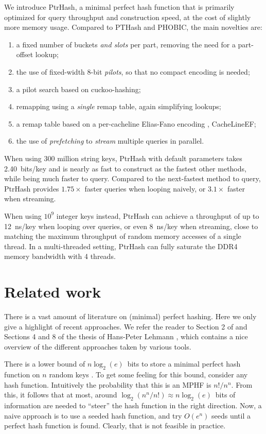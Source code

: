 \documentclass[a4paper,UKenglish,cleveref,thm-restate]{lipics-v2021}
\begin{document}
We introduce PtrHash, a minimal perfect hash function that is primarily optimized for
query throughput and construction speed, at the cost of slightly more memory usage.
Compared to PTHash and PHOBIC, the main novelties are:
\begin{enumerate}
\item a fixed number of buckets \emph{and slots} per part, removing the need for
  a part-offset lookup;
\item the use of fixed-width 8-bit \emph{pilots}, so that no compact encoding is
  needed;
\item a pilot search based on cuckoo-hashing;
\item remapping using a \emph{single} remap table, again simplifying lookups;
\item a remap table based on a per-cacheline Elias-Fano encoding \cite{elias,fano}, CacheLineEF;
\item the use of \emph{prefetching} to \emph{stream} multiple queries in parallel.
\end{enumerate}

When using 300 million string keys, PtrHash with default parameters takes 2.40~bits/key and is nearly as fast to construct as the fastest
other methods, while being much faster to query. Compared to the next-fastest
method to query, PtrHash provides \(1.75\times\) faster queries when looping naively, or \(3.1\times\) faster when streaming.

When using \(10^9\) integer keys instead, PtrHash can achieve a throughput of up to
12~ns/key when looping over queries, or even 8~ns/key when streaming, close to matching the
maximum throughput of random memory accesses of a single thread. In a
multi-threaded setting, PtrHash can fully saturate the DDR4 memory bandwidth
with 4 threads.
\section{Related work}
\label{sec:org04db7a4}
There is a vast amount of literature on (minimal) perfect hashing. Here we only
give a highlight of recent approaches. We refer the reader to Section 2 of
\cite{pthash-2} and Sections 4 and 8 of the thesis of Hans-Peter Lehmann
\cite{phf-thesis}, which contains a nice overview of the different approaches
taken by various tools.

There is a lower bound of \(n \log_2(e)\)~bits to store a minimal perfect hash
function on \(n\) random keys \cite{mehlhorn82_mphf_size}.
To get some feeling for this bound, consider any hash function.
Intuitively the probability that this is
an MPHF is \(n!/n^n\). From this, it follows that at most, around
\(\log_2(n^n/n!)\approx n\log_2(e)\)~bits of information are needed to ``steer'' the hash
function in the right direction.
Now, a naive approach is to use a seeded hash function, and try
\(O(e^n)\) seeds until a perfect hash function is found. Clearly, that is not
feasible in practice.
\end{document}
